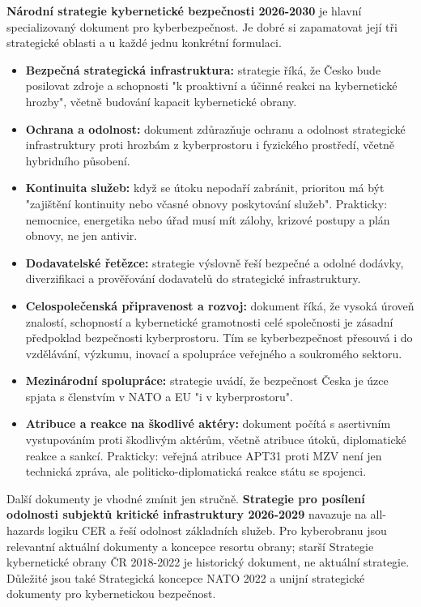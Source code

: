 \textbf{Národní strategie kybernetické bezpečnosti 2026-2030} je hlavní specializovaný dokument pro kyberbezpečnost. Je dobré si zapamatovat její tři strategické oblasti a u každé jednu konkrétní formulaci.
\begin{itemize}
  \item \textbf{Bezpečná strategická infrastruktura:} strategie říká, že Česko bude posilovat zdroje a schopnosti "k proaktivní a účinné reakci na kybernetické hrozby", včetně budování kapacit kybernetické obrany.
  \item \textbf{Ochrana a odolnost:} dokument zdůrazňuje ochranu a odolnost strategické infrastruktury proti hrozbám z kyberprostoru i fyzického prostředí, včetně hybridního působení.
  \item \textbf{Kontinuita služeb:} když se útoku nepodaří zabránit, prioritou má být "zajištění kontinuity nebo včasné obnovy poskytování služeb". Prakticky: nemocnice, energetika nebo úřad musí mít zálohy, krizové postupy a plán obnovy, ne jen antivir.
  \item \textbf{Dodavatelské řetězce:} strategie výslovně řeší bezpečné a odolné dodávky, diverzifikaci a prověřování dodavatelů do strategické infrastruktury.
  \item \textbf{Celospolečenská připravenost a rozvoj:} dokument říká, že vysoká úroveň znalostí, schopností a kybernetické gramotnosti celé společnosti je zásadní předpoklad bezpečnosti kyberprostoru. Tím se kyberbezpečnost přesouvá i do vzdělávání, výzkumu, inovací a spolupráce veřejného a soukromého sektoru.
  \item \textbf{Mezinárodní spolupráce:} strategie uvádí, že bezpečnost Česka je úzce spjata s členstvím v NATO a EU "i v kyberprostoru".
  \item \textbf{Atribuce a reakce na škodlivé aktéry:} dokument počítá s asertivním vystupováním proti škodlivým aktérům, včetně atribuce útoků, diplomatické reakce a sankcí. Prakticky: veřejná atribuce APT31 proti MZV není jen technická zpráva, ale politicko-diplomatická reakce státu se spojenci.
\end{itemize}

Další dokumenty je vhodné zmínit jen stručně. \textbf{Strategie pro posílení odolnosti subjektů kritické infrastruktury 2026-2029} navazuje na all-hazards logiku CER a řeší odolnost základních služeb. Pro kyberobranu jsou relevantní aktuální dokumenty a koncepce resortu obrany; starší Strategie kybernetické obrany ČR 2018-2022 je historický dokument, ne aktuální strategie. Důležité jsou také Strategická koncepce NATO 2022 a unijní strategické dokumenty pro kybernetickou bezpečnost.

